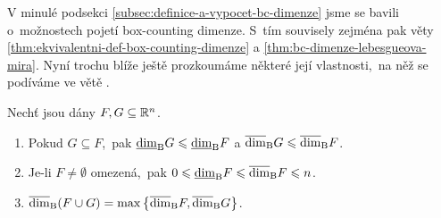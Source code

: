 V minulé podsekci \ref{subsec:definice-a-vypocet-bc-dimenze} jsme se bavili o~možnostech pojetí box-counting dimenze. S~tím souvisely zejména pak věty \ref{thm:ekvivalentni-def-box-counting-dimenze} a \ref{thm:bc-dimenze-lebesgueova-mira}. Nyní trochu blíže ještě prozkoumáme některé její vlastnosti,~na něž se podíváme ve větě .
\begin{theorem}\label{thm:vlastnosti-bc-dimenze}
    Nechť jsou dány $F,G\subseteq\mathbb{R}^n$.
    \begin{enumerate}[label=(\roman*)]
        \item\label{thm:monotonie-bc-dimenze} Pokud $G\subseteq F$,~pak $\underline{\dim}_\textup{B}{G}\leqslant\underline{\dim}_\textup{B}{F}$ a $\overline{\dim}_\textup{B}{G}\leqslant\overline{\dim}_\textup{B}{F}$.
        \item\label{thm:rozsah-hodnot-bc-dimenze} Je-li $F\neq\emptyset$ omezená,~pak $0\leqslant\underline{\dim}_\textup{B}{F}\leqslant\overline{\dim}_\textup{B}{F}\leqslant n$. 
        \item\label{thm:stabilita-bc-dimenze} $\overline{\dim}_\textup{B}(F\cup G)=\max\left\{\overline{\dim}_\textup{B}{F},\overline{\dim}_\textup{B}{G}\right\}$.
    \end{enumerate}
\end{theorem}

